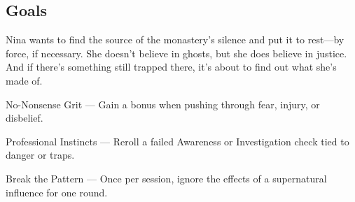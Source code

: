\documentclass[nodeprecatedcode,bg=print]{dndbook/dndbook}
\begin{document}
\begin{WyrdCharacterSheet}
    \subsection{Goals}
    Nina wants to find the source of the monastery’s silence and put it to rest—by force, if necessary. She doesn’t believe in ghosts, but she does believe in justice. And if there’s something still trapped there, it’s about to find out what she's made of.
  
    \begin{WyrdStatsBlock}[profile=img/characters/nina_maddox]
        \SkillsBox[%
            expert={Fight},%
            skilled={Awareness, Focus},%
            novice={Will, Investigation, Insight},%
        ]
  
        \begin{TraitsBox}
            \item[No-Nonsense Grit] — Gain a bonus when pushing through fear, injury, or disbelief.
            \item[Professional Instincts] — Reroll a failed Awareness or Investigation check tied to danger or traps.
            \item[Break the Pattern] — Once per session, ignore the effects of a supernatural influence for one round.
        \end{TraitsBox}
  
        \DamageBox[%
        ]
    \end{WyrdStatsBlock}
\end{WyrdCharacterSheet}
  
\end{document}
